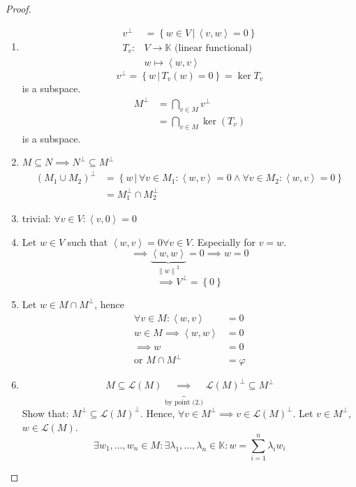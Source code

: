 \documentclass{article}
\newcommand{\set}[1]{\left\{#1\right\}}
\newcommand{\setdef}[2]{\left\{\left.#1\,\right|\,#2\right\}}
\newcommand{\ip}[2]{\left\langle#1,#2\right\rangle} %
\newcommand{\norm}[1]{\left\|#1\right\|}
\begin{document}
\begin{proof}
  \begin{enumerate}
    \item
      \begin{align*}
        v^\bot &= \setdef{w \in V}{\ip vw = 0} \\
          T_v: & V \to \mathbb K \text{ (linear functional)} \\
               & w \mapsto \ip wv
      \end{align*}
      \[ v^\bot = \setdef{w}{T_v(w) = 0} = \ker{T_v} \]
      is a subspace.
      \begin{align*}
        M^\bot &= \bigcap_{v \in M} v^\bot \\
               &= \bigcap_{v \in M} \ker(T_v)
      \end{align*}
      is a subspace.
    \item
      $M \subseteq N \implies N^\bot \subseteq M^\bot$
      \begin{align*}
        (M_1 \cup M_2)^\bot
          &= \setdef{w}{\forall v \in M_1: \ip wv = 0 \land \forall v \in M_2: \ip wv = 0} \\
          &= M_1^\bot \cap M_2^\bot
      \end{align*}
    \item trivial: $\forall v \in V: \ip v0 = 0$
    \item Let $w \in V$ such that $\ip wv = 0 \forall v \in V$. Especially for $v = w$.
      \[ \implies \underbrace{\ip ww}_{\norm{w}^2} = 0 \implies w = 0 \]
      \[ \implies V^\bot = \set{0} \]
    \item
      Let $w \in M \cap M^\bot$, hence
      \begin{align*}
        \forall v \in M: \ip wv &= 0 \\
        w \in M \implies \ip ww &= 0 \\
        \implies w &= 0 \\
        \text{or } M \cap M^\bot &= \varphi
      \end{align*}
    \item
      \[ M \subseteq \mathcal L(M) \underbrace{\implies}_{\text{by point (2.)}} \mathcal L(M)^\bot \subseteq M^\bot \]
      Show that: $M^\bot \subseteq \mathcal L(M)^\bot$.
      Hence, $\forall v \in M^\bot \implies v \in \mathcal L(M)^\bot$.
      Let $v \in M^\bot$, $w \in \mathcal L(M)$.
      \[
        \exists w_1, \ldots, w_n \in M: \exists \lambda_1, \ldots, \lambda_n \in \mathbb K:
        w = \sum_{i=1}^n \lambda_i w_i
\]
\end{enumerate}
\end{proof}
\end{document}
